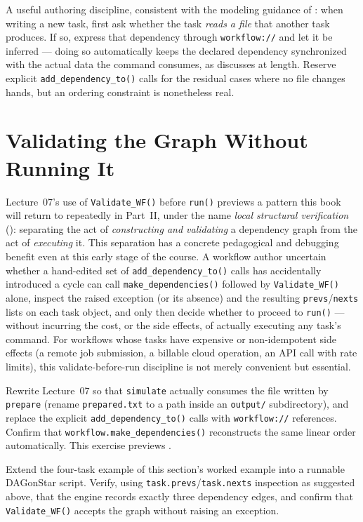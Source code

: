 \begin{practicebox}
A useful authoring discipline, consistent with the modeling guidance of
: when writing a new task, first ask whether the task
\emph{reads a file} that another task produces. If so, express that
dependency through \texttt{workflow://} and let it be inferred --- doing so
automatically keeps the declared dependency synchronized with the actual
data the command consumes, as  discusses at length. Reserve
explicit \texttt{add\_dependency\_to()} calls for the residual cases where no
file changes hands, but an ordering constraint is nonetheless real.
\end{practicebox}

\section{Validating the Graph Without Running It}

Lecture~07's use of \texttt{Validate\_WF()} before \texttt{run()} previews a
pattern this book will return to repeatedly in Part~II, under the name
\emph{local structural verification} (): separating the
act of \emph{constructing and validating} a dependency graph from the act of
\emph{executing} it. This separation has a concrete pedagogical and
debugging benefit even at this early stage of the course. A
workflow author uncertain whether a hand-edited set of
\texttt{add\_dependency\_to()} calls has accidentally introduced a cycle can
call \texttt{make\_dependencies()} followed by \texttt{Validate\_WF()} alone,
inspect the raised exception (or its absence) and the resulting
\texttt{prevs}/\texttt{nexts} lists on each task object, and only then decide
whether to proceed to \texttt{run()} --- without incurring the cost, or the
side effects, of actually executing any task's command. For workflows whose
tasks have expensive or non-idempotent side effects (a remote job
submission, a billable cloud operation, an API call with rate limits), this
validate-before-run discipline is not merely convenient but essential.

\begin{exercise}
Rewrite Lecture~07 so that \texttt{simulate} actually consumes the file written
by \texttt{prepare} (rename \texttt{prepared.txt} to a path inside an
\texttt{output/} subdirectory), and replace the explicit
\texttt{add\_dependency\_to()} calls with \texttt{workflow://} references.
Confirm that \texttt{workflow.make\_dependencies()} reconstructs the same
linear order automatically. This exercise previews .
\end{exercise}

\begin{exercise}
Extend the four-task example of this section's worked example into a
runnable DAGonStar script. Verify, using
\texttt{task.prevs}/\texttt{task.nexts} inspection as suggested above, that
the engine records exactly three dependency edges, and confirm that
\texttt{Validate\_WF()} accepts the graph without raising an exception.
\end{exercise}
